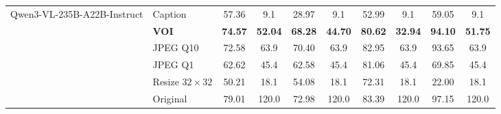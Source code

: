 \begin{table}[p]
{\begin{tabular}{llcccccccc}
\multirow{6}{*}{Qwen3-VL-235B-A22B-Instruct}
& Caption & 57.36 & 9.1 & 28.97 & 9.1 & 52.99 & 9.1 & 59.05 & 9.1 \\
& \textbf{VOI} & \textbf{74.57} & \textbf{52.04} & \textbf{68.28} & \textbf{44.70} & \textbf{80.62} & \textbf{32.94} & \textbf{94.10} & \textbf{51.75} \\
& JPEG Q10 & 72.58 & 63.9 & 70.40 & 63.9 & 82.95 & 63.9 & 93.65 & 63.9 \\
& JPEG Q1 & 62.62 & 45.4 & 62.58 & 45.4 & 81.06 & 45.4 & 69.85 & 45.4 \\
& Resize $32{\times}32$ & 50.21 & 18.1 & 54.08 & 18.1 & 72.31 & 18.1 & 22.00 & 18.1 \\
& Original & 79.01 & 120.0 & 72.98 & 120.0 & 83.39 & 120.0 & 97.15 & 120.0 \\
\bottomrule
\end{tabular}
}
\end{table}


